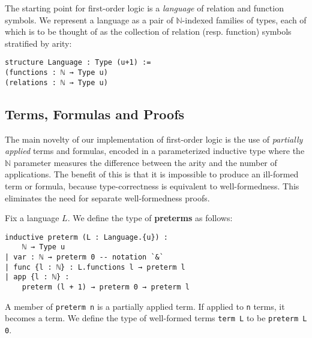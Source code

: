 \documentclass[sigplan,10pt,review]{acmart}
\newcommand{\lil}{\lstinline}
\newcommand{\N}{\mathbb{N}}
\theoremstyle{definition}
\begin{document}
The starting point for first-order logic is a \emph{language} of relation and function symbols.
We represent a language as a pair of $\N$-indexed families of types, each of which is to be thought of as the collection of relation (resp. function) symbols stratified by arity:
\begin{lstlisting}
structure Language : Type (u+1) :=
(functions : ℕ → Type u)
(relations : ℕ → Type u)
\end{lstlisting}
\subsection{Terms, Formulas and Proofs}
\label{subsect:fol:terms}
The main novelty of our implementation of first-order logic is the use of \emph{partially applied} terms and formulas, encoded in a parameterized inductive type where the $\N$ parameter measures the difference between the arity and the number of applications.
The benefit of this is that it is impossible to produce an ill-formed term or formula, because type-correctness is equivalent to well-formedness.
This eliminates the need for separate well-formedness proofs.

Fix a language $L$. We define the type of \textbf{preterms} as follows:
\begin{lstlisting}
inductive preterm (L : Language.{u}) :
    ℕ → Type u
| var : ℕ → preterm 0 -- notation `&`
| func {l : ℕ} : L.functions l → preterm l
| app {l : ℕ} :
    preterm (l + 1) → preterm 0 → preterm l
\end{lstlisting}
A member of \lil{preterm n} is a partially applied term.
If applied to \lil{n} terms, it becomes a term.
We define the type of well-formed terms \lil{term L} to be \lil{preterm L 0}.

\end{document}
